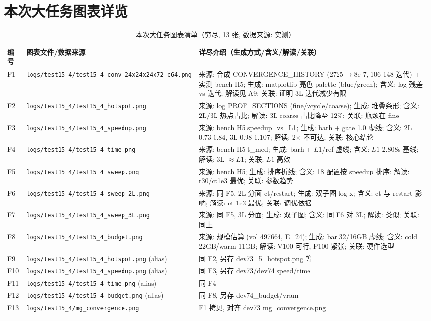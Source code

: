 \documentclass[UTF8]{ctexart}
\begin{document}
\section{本次大任务图表详览}
\begin{xltabular}{\textwidth}{llX}
\toprule
编号 & 图表文件/数据来源 & 详尽介绍（生成方式/含义/解读/关联） \\
\midrule
\endhead
F1 & \texttt{\nolinkurl{logs/test15_4/test15_4_conv_24x24x24x72_c64.png}} & 来源: 合成 CONVERGENCE\_HISTORY (2725$\to$8e-7, 106-148 迭代) + 实测 bench H5; 生成: matplotlib 亮色 palette (blue/green); 含义: log 残差 vs 迭代; 解读见 A9; 关联: 证明 3L 迭代减少有限 \\
F2 & \texttt{\nolinkurl{logs/test15_4/test15_4_hotspot.png}} & 来源: log PROF\_SECTIONS (fine/vcycle/coarse); 生成: 堆叠条形; 含义: 2L/3L 热点占比; 解读: 3L coarse 占比降至 12\%; 关联: 瓶颈在 fine \\
F3 & \texttt{\nolinkurl{logs/test15_4/test15_4_speedup.png}} & 来源: bench H5 speedup\_vs\_L1; 生成: barh + gate 1.0 虚线; 含义: 2L 0.73-0.84, 3L 0.98-1.107; 解读: 2$\times$ 不可达; 关联: 核心结论 \\
F4 & \texttt{\nolinkurl{logs/test15_4/test15_4_time.png}} & 来源: bench H5 t\_med; 生成: barh + $L1$/ref 虚线; 含义: $L1$ 2.808s 基线; 解读: 3L $\approx L1$; 关联: $L1$ 高效 \\
F5 & \texttt{\nolinkurl{logs/test15_4/test15_4_sweep.png}} & 来源: bench H5; 生成: 排序折线; 含义: 18 配置按 speedup 排序; 解读: r30/ct1e3 最优; 关联: 参数趋势 \\
F6 & \texttt{\nolinkurl{logs/test15_4/test15_4_sweep_2L.png}} & 来源: 同 F5, 2L 分面 ct/restart; 生成: 双子图 log-x; 含义: ct 与 restart 影响; 解读: ct 1e3 最优; 关联: 调优依据 \\
F7 & \texttt{\nolinkurl{logs/test15_4/test15_4_sweep_3L.png}} & 来源: 同 F5, 3L 分面; 生成: 双子图; 含义: 同 F6 对 3L; 解读: 类似; 关联: 同上 \\
F8 & \texttt{\nolinkurl{logs/test15_4/test15_4_budget.png}} & 来源: 规模估算 (vol 497664, E=24); 生成: bar 32/16GB 虚线; 含义: cold 22GB/warm 11GB; 解读: V100 可行, P100 紧张; 关联: 硬件选型 \\
F9 & \texttt{\nolinkurl{logs/test15_4/test15_4_hotspot.png}} (alias) & 同 F2, 另存 dev73\_5\_hotspot.png 等 \\
F10 & \texttt{\nolinkurl{logs/test15_4/test15_4_speedup.png}} (alias) & 同 F3, 另存 dev73/dev74 speed/time \\
F11 & \texttt{\nolinkurl{logs/test15_4/test15_4_time.png}} (alias) & 同 F4 \\
F12 & \texttt{\nolinkurl{logs/test15_4/test15_4_budget.png}} (alias) & 同 F8, 另存 dev74\_budget/vram \\
F13 & \texttt{\nolinkurl{logs/test15_4/mg_convergence.png}} & F1 拷贝, 对齐 dev73 mg\_convergence.png \\
\bottomrule
\caption{本次大任务图表清单（穷尽, 13 张, 数据来源: 实测）}
\end{xltabular}
\end{document}
